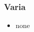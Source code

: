 \documentclass[12pt]{article}
\begin{document}
\subsubsection{Varia}
\begin{itemize}
	\item none
\end{itemize}




\end{document}
